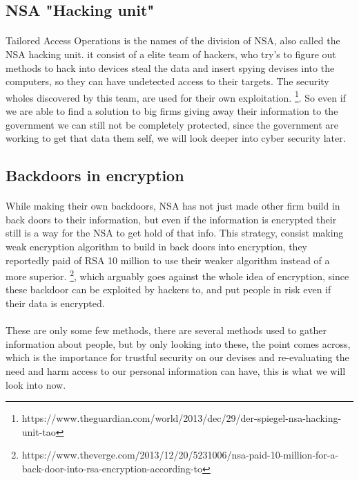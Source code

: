 \documentclass{article}
\begin{document}
\subsection{NSA "Hacking unit"}
\paragraph{}
Tailored Access Operations is the names of the division of NSA, also called the NSA hacking unit. it consist of a elite team of hackers, who try's to figure out methods to hack into devices steal the data and insert spying devises into the computers, so they can have undetected access to their targets. The security wholes discovered by this team, are used for their own exploitation. \footnote{https://www.theguardian.com/world/2013/dec/29/der-spiegel-nsa-hacking-unit-tao}. So even if we are able to find a solution to big firms giving away their information to the government we can still not be completely protected, since the government are working to get that data them self, we will look deeper into cyber security later.

\subsection{Backdoors in encryption}
\paragraph{}
While making their own backdoors, NSA has not just made other firm build in back doors to their information, but even if the information is encrypted their still is a way for the NSA to get hold of that info. This strategy, consist making weak encryption algorithm to build in back doors into encryption, they reportedly paid of RSA 10 million to use their weaker algorithm instead of a more superior. \footnote{https://www.theverge.com/2013/12/20/5231006/nsa-paid-10-million-for-a-back-door-into-rsa-encryption-according-to}, which arguably goes against the whole idea of encryption, since these backdoor can be exploited by hackers to, and put people in risk even if their data is encrypted.

\paragraph{}
These are only some few methods, there are several methods used to gather information about people, but by only looking into these, the point comes across, which is the importance for trustful security on our devises and re-evaluating the need and harm access to our personal information can have, this is what we will look into now.
\end{document}

